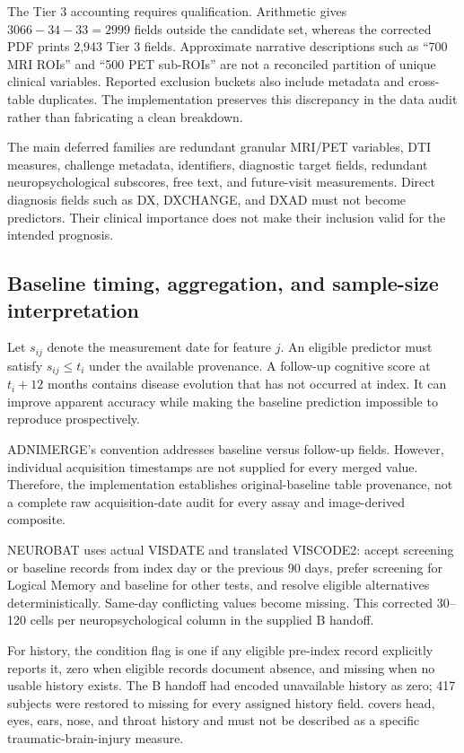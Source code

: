 \documentclass[11pt,a4paper]{article}
\newcommand{\field}[1]{\texttt{\detokenize{#1}}}
\begin{document}
The Tier 3 accounting requires qualification. Arithmetic gives $3066-34-33=2999$ fields outside the candidate set, whereas the corrected PDF prints 2,943 Tier 3 fields. Approximate narrative descriptions such as ``700 MRI ROIs'' and ``500 PET sub-ROIs'' are not a reconciled partition of unique clinical variables. Reported exclusion buckets also include metadata and cross-table duplicates. The implementation preserves this discrepancy in the data audit rather than fabricating a clean breakdown.

The main deferred families are redundant granular MRI/PET variables, DTI measures, challenge metadata, identifiers, diagnostic target fields, redundant neuropsychological subscores, free text, and future-visit measurements. Direct diagnosis fields such as DX, DXCHANGE, and DXAD must not become predictors. Their clinical importance does not make their inclusion valid for the intended prognosis.

\clearpage
\subsection{Baseline timing, aggregation, and sample-size interpretation}
Let $s_{ij}$ denote the measurement date for feature $j$. An eligible predictor must satisfy $s_{ij}\leq t_i$ under the available provenance. A follow-up cognitive score at $t_i+12$ months contains disease evolution that has not occurred at index. It can improve apparent accuracy while making the baseline prediction impossible to reproduce prospectively.

ADNIMERGE's \field{_bl} convention addresses baseline versus follow-up fields. However, individual acquisition timestamps are not supplied for every merged value. Therefore, the implementation establishes original-baseline table provenance, not a complete raw acquisition-date audit for every assay and image-derived composite.

NEUROBAT uses actual VISDATE and translated VISCODE2: accept screening or baseline records from index day or the previous 90 days, prefer screening for Logical Memory and baseline for other tests, and resolve eligible alternatives deterministically. Same-day conflicting values become missing. This corrected 30--120 cells per neuropsychological column in the supplied B handoff.

For history, the condition flag is one if any eligible pre-index record explicitly reports it, zero when eligible records document absence, and missing when no usable history exists. The B handoff had encoded unavailable history as zero; 417 subjects were restored to missing for every assigned history field. \field{MH3HEAD} covers head, eyes, ears, nose, and throat history and must not be described as a specific traumatic-brain-injury measure.
\end{document}
